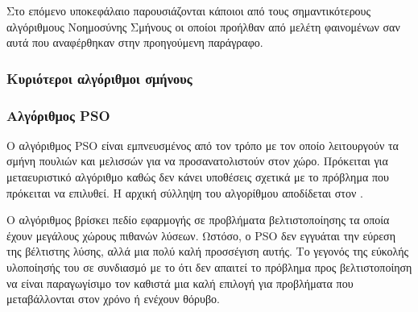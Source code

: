 \documentclass{assignment}
\begin{document}
Στο επόμενο υποκεφάλαιο παρουσιάζονται κάποιοι από τους σημαντικότερους
αλγόριθμους Νοημοσύνης Σμήνους οι οποίοι προήλθαν από μελέτη φαινομένων σαν
αυτά που αναφέρθηκαν στην προηγούμενη παράγραφο.
\subsubsection*{Κυριότεροι αλγόριθμοι σμήνους}
\subsubsection*{Αλγόριθμος PSO}
O αλγόριθμος PSO είναι εμπνευσμένος από τον τρόπο με τον οποίο λειτουργούν
τα σμήνη πουλιών και μελισσών για να προσανατολιστούν στον χώρο. Πρόκειται για
μεταευριστικό αλγόριθμο καθώς δεν κάνει υποθέσεις σχετικά με το πρόβλημα που
πρόκειται να επιλυθεί. Η αρχική σύλληψη του αλγορίθμου αποδίδεται στον \citet{kennedy2010particle}.

Ο αλγόριθμος βρίσκει πεδίο εφαρμογής σε προβλήματα βελτιστοποίησης τα οποία
έχουν μεγάλους χώρους πιθανών λύσεων. Ωστόσο, ο PSO δεν εγγυάται την εύρεση
της βέλτιστης λύσης, αλλά μια πολύ καλή προσσέγιση αυτής. Το γεγονός της εύκολής
υλοποίησής του σε συνδιασμό με το ότι δεν απαιτεί το πρόβλημα προς
βελτιστοποίηση να είναι παραγωγίσιμο \cite{kennedy2010particle} τον καθιστά μια
καλή επιλογή για προβλήματα που μεταβάλλονται στον χρόνο ή ενέχουν θόρυβο.
\end{document}
